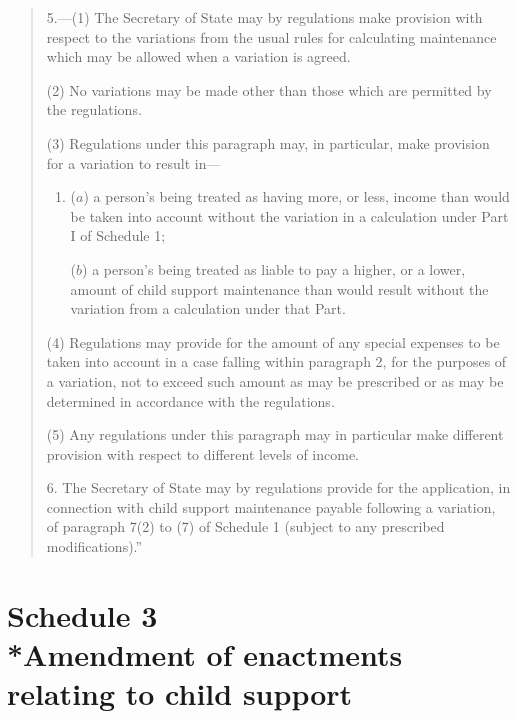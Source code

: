 \documentclass[12pt,a4paper]{article}
\begin{document}
\begin{quotation}
5.---(1) The Secretary of State may by regulations make provision with respect to the variations from the usual rules for calculating maintenance which may be allowed when a variation is agreed.

(2) No variations may be made other than those which are permitted by the regulations.

(3) Regulations under this paragraph may, in particular, make provision for a variation to result in—
\begin{enumerate}\item[]
($a$) a person’s being treated as having more, or less, income than would be taken into account without the variation in a calculation under Part I of Schedule 1;

($b$) a person’s being treated as liable to pay a higher, or a lower, amount of child support maintenance than would result without the variation from a calculation under that Part.
\end{enumerate}

(4) Regulations may provide for the amount of any special expenses to be taken into account in a case falling within paragraph 2, for the purposes of a variation, not to exceed such amount as may be prescribed or as may be determined in accordance with the regulations.

(5) Any regulations under this paragraph may in particular make different provision with respect to different levels of income.

\medskip

6. The Secretary of State may by regulations provide for the application, in connection with child support maintenance payable following a variation, of paragraph 7(2)  to (7)  of Schedule 1 (subject to any prescribed modifications).”
\end{quotation}

\part[Schedule 3 --- Amendment of enactments relating to child support]{Schedule 3\\*Amendment of enactments relating to child support}

\renewcommand\parthead{--- Schedule 3}

\end{document}
